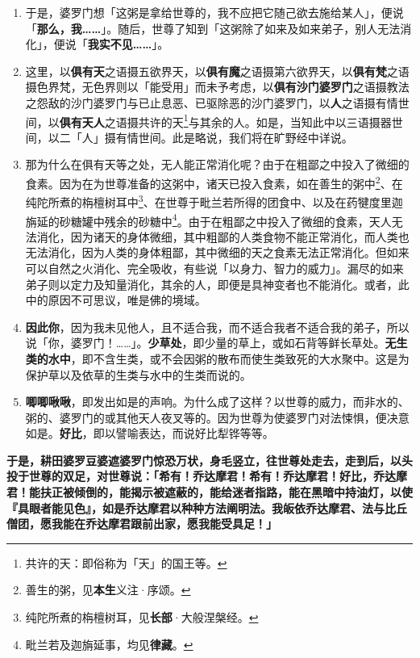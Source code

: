 \begin{enumerate}\item 于是，婆罗门想「这粥是拿给世尊的，我不应把它随己欲去施给某人」，便说「\textbf{那么，我……}」。随后，世尊了知到「这粥除了如来及如来弟子，别人无法消化」，便说「\textbf{我实不见……}」。
\item 这里，以\textbf{俱有天}之语摄五欲界天，以\textbf{俱有魔}之语摄第六欲界天，以\textbf{俱有梵}之语摄色界梵，无色界则以「能受用」而未予考虑，以\textbf{俱有沙门婆罗门}之语摄教法之怨敌的沙门婆罗门与已止息恶、已驱除恶的沙门婆罗门，以\textbf{人}之语摄有情世间，以\textbf{俱有天人}之语摄共许的天\footnote{共许的天：即俗称为「天」的国王等。}与其余的人。如是，当知此中以三语摄器世间，以二「人」摄有情世间。此是略说，我们将在旷野经中详说。
\item 那为什么在俱有天等之处，无人能正常消化呢？由于在粗鄙之中投入了微细的食素。因为在为世尊准备的这粥中，诸天已投入食素，如在善生的粥中\footnote{善生的粥，见\textbf{本生}义注·序颂。}、在纯陀所煮的栴檀树耳中\footnote{纯陀所煮的栴檀树耳，见\textbf{长部}·大般涅槃经。}、在世尊于毗兰若所得的团食中、以及在药犍度里迦旃延的砂糖罐中残余的砂糖中\footnote{毗兰若及迦旃延事，均见\textbf{律藏}。}。由于在粗鄙之中投入了微细的食素，天人无法消化，因为诸天的身体微细，其中粗鄙的人类食物不能正常消化，而人类也无法消化，因为人类的身体粗鄙，其中微细的天之食素无法正常消化。但如来可以自然之火消化、完全吸收，有些说「以身力、智力的威力」。漏尽的如来弟子则以定力及知量消化，其余的人，即便是具神变者也不能消化。或者，此中的原因不可思议，唯是佛的境域。
\item \textbf{因此你}，因为我未见他人，且不适合我，而不适合我者不适合我的弟子，所以说「你，婆罗门！……」。\textbf{少草处}，即少量的草上，或如石背等鲜长草处。\textbf{无生类的水中}，即不含生类，或不会因粥的散布而使生类致死的大水聚中。这是为保护草以及依草的生类与水中的生类而说的。
\item \textbf{唧唧啾啾}，即发出如是的声响。为什么成了这样？以世尊的威力，而非水的、粥的、婆罗门的或其他天人夜叉等的。因为世尊为使婆罗门对法悚惧，便决意如是。\textbf{好比}，即以譬喻表达，而说好比犁铧等等。\end{enumerate}

\textbf{于是，耕田婆罗豆婆遮婆罗门惊恐万状，身毛竖立，往世尊处走去，走到后，以头投于世尊的双足，对世尊说：「希有！乔达摩君！希有！乔达摩君！好比，乔达摩君！能扶正被倾倒的，能揭示被遮蔽的，能给迷者指路，能在黑暗中持油灯，以使『具眼者能见色』，如是乔达摩君以种种方法阐明法。我皈依乔达摩君、法与比丘僧团，愿我能在乔达摩君跟前出家，愿我能受具足！」}

